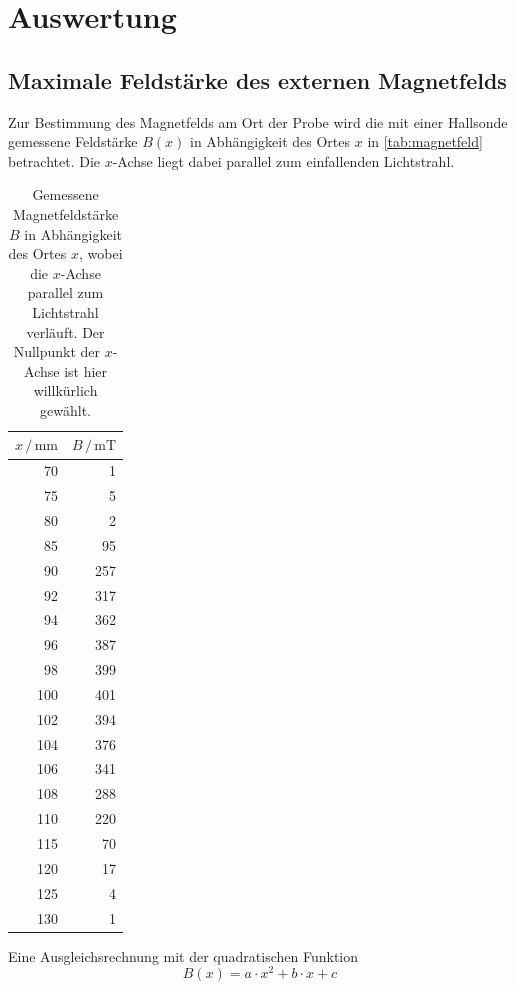 \section{Auswertung}
\label{sec:Auswertung}

\subsection{Maximale Feldstärke des externen Magnetfelds}
Zur Bestimmung des Magnetfelds am Ort der Probe wird die mit einer Hallsonde gemessene Feldstärke $B(x)$ in Abhängigkeit des Ortes $x$ in \autoref{tab:magnetfeld} betrachtet.
Die $x$-Achse liegt dabei parallel zum einfallenden Lichtstrahl.

\begin{table}
    \centering
    \caption{Gemessene Magnetfeldstärke $B$ in Abhängigkeit des Ortes $x$, wobei die $x$-Achse parallel zum Lichtstrahl verläuft.
    Der Nullpunkt der $x$-Achse ist hier willkürlich gewählt.
    }
    \label{tab:magnetfeld}
    \begin{tabular}{r r}
        \toprule
        $x \,/\, \unit{\milli\metre}$ & $B \,/\, \unit{\milli\tesla}$\\
        \midrule
        70 & 1 \\
        75 & 5 \\
        80 & 2 \\
        85 & 95 \\
        90 & 257 \\
        92 & 317 \\
        94 & 362 \\
        96 & 387 \\
        98 & 399 \\
        100 & 401 \\
        102 & 394 \\
        104 & 376 \\
        106 & 341 \\
        108 & 288 \\
        110 & 220 \\
        115 & 70 \\
        120 & 17 \\
        125 & 4 \\
        130 & 1 \\
        \bottomrule
    \end{tabular}
\end{table}
Eine Ausgleichsrechnung mit der quadratischen Funktion
\begin{equation}
    B(x) = a \cdot x^2 + b \cdot x + c
\end{equation}
